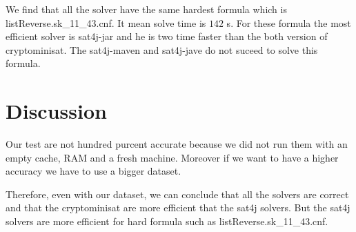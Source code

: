 \documentclass{article}
\begin{document}
We find that all the solver have the same hardest formula which is listReverse.sk\_11\_43.cnf. It mean solve time is $142 $ s. 
For these formula the most efficient solver is sat4j-jar and he is two time faster than the both version of cryptominisat. The sat4j-maven and sat4j-jave do not suceed to solve this formula. 


\section{Discussion}
Our test are not hundred purcent accurate because we did not run them with an empty cache, RAM and a fresh machine. Moreover if we want to have a higher accuracy we have to use a bigger dataset.

Therefore, even with our dataset, we can conclude that all the solvers are correct and that the cryptominisat are more efficient that the sat4j solvers. But the sat4j solvers are more efficient for hard formula such as listReverse.sk\_11\_43.cnf.
\end{document}
